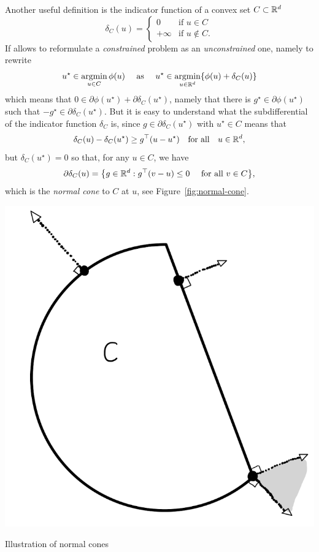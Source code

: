 Another useful definition is the indicator function of a convex set $C \subset \mathbb R^d$
\begin{equation*}
	\delta_C(u) = \begin{cases}
		0 &\text{if } u \in C \\
		+\infty &\text{if } u \notin C.
	\end{cases}
\end{equation*}
If allows to reformulate a \emph{constrained} problem as an \emph{unconstrained} one, namely to rewrite
\begin{equation*}
	u^\star \in \operatorname*{argmin}_{u \in C} \phi(u) \quad \text{ as } \quad u^\star \in \operatorname*{argmin}_{u \in \mathbb R^d} \{ \phi(u) + \delta_C(u) \}
\end{equation*}
which means that $0 \in \partial \phi(u^\star) + \partial \delta_C(u^\star)$, namely that there is $g^\star \in \partial \phi(u^\star)$ such that $-g^\star \in \partial \delta_C(u^\star)$.
But it is easy to understand what the subdifferential of the indicator function $\delta_C$ is, since $g \in \partial \delta_C(u^\star)$ with $u^\star \in C$ means%
that
\begin{equation*}
	\delta_C(u) - \delta_C(u^\star) \geq g^\top (u - u^\star) \quad \text{for all} \quad u \in \mathbb R^d,
\end{equation*}
but $\delta_C(u^\star) = 0$ so that, for any $u \in C$, we have
\begin{equation*}
	\partial \delta_C(u) = \big\{ g \in \mathbb R^d : g^\top (v - u) \leq 0 \quad 
	\text{ for all } v \in C \big\},
\end{equation*}
which is the \emph{normal cone} to $C$ at $u$, see Figure~\ref{fig:normal-cone}.
\begin{marginfigure}[*-3]
	\includegraphics{assets/normal-cone.png}
	\caption{Illustration of normal cones}
	\label{fig:normal-cone}
\end{marginfigure}
